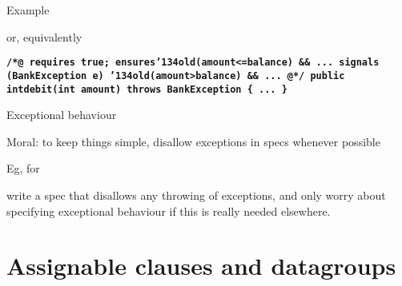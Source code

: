 \documentclass[
pdf,
nocolorBG,
slideColor,
erik,
]{prosper}
\newcommand{\code}[1]{{\rm \texttt{\textbf{\small #1}}}}
\newcommand{\old}     {\(\backslash\)old}
\newcommand{\bsl}{\char'134}
\renewcommand{\old}{\bsl old}
\begin{document}
\begin{slide}{Example}
\vspace*{-3ex}

or, equivalently

\begin{alltt}\code{\scriptsize{\green /*@} requires true;
     ensures{\red \old(amount<=balance)} && ...
     signals (BankException e)  
            {\red \old(amount>balance)} && ...
{\green   @*/}
  public int{\green debit}(int amount) throws BankException 
  \{ ...  \}
}
\end{alltt}


\end{slide}



\begin{slide}{Exceptional behaviour}
\vspace*{-3ex}

Moral: to keep things simple, disallow exceptions
in specs whenever possible

\bigskip

{\footnotesize
Eg, for


write a spec that disallows any throwing of exceptions, and only
worry about specifying exceptional behaviour if this is really needed
elsewhere.}

\end{slide}

\part{{\Large \red Assignable clauses and datagroups }}
\end{document}
